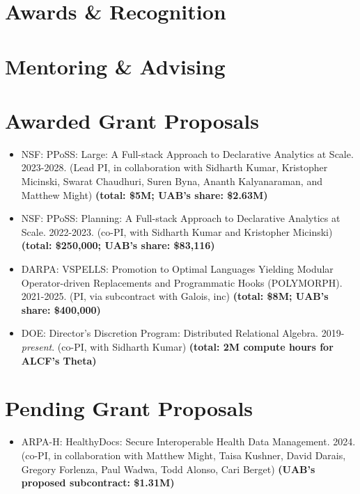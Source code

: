 \documentclass[line]{res}
\begin{document}
\begin{resume}
\section{\large Awards \& Recognition} \vspace{0.2in}


\section{\large Mentoring \& Advising}



\section{\large Awarded Grant Proposals} \vspace{0.45cm}

\begin{itemize}
  \item
  NSF: PPoSS: Large: A Full-stack Approach to Declarative Analytics at Scale. 2023-2028. (Lead PI, in collaboration with Sidharth Kumar, Kristopher Micinski, Swarat Chaudhuri, Suren Byna, Ananth Kalyanaraman, and Matthew Might) \textbf{(total: \$5M; UAB's share: \$2.63M)} 
  \item
  NSF: PPoSS: Planning: A Full-stack Approach to Declarative Analytics at Scale. 2022-2023. (co-PI, with Sidharth Kumar and Kristopher Micinski) \textbf{(total: \$250,000; UAB's share: \$83,116)} 
  \item
  DARPA: VSPELLS: Promotion to Optimal Languages Yielding Modular Operator-driven Replacements and Programmatic Hooks (POLYMORPH). 2021-2025. (PI, via subcontract with Galois, inc) \textbf{(total: \$8M; UAB's share: \$400,000)}
  \item
  DOE: Director's Discretion Program: Distributed Relational Algebra. 2019-\textit{present}. (co-PI, with Sidharth Kumar) \textbf{(total: 2M compute hours for ALCF's Theta)}
\end{itemize}

\section{\large Pending Grant Proposals} \vspace{0.45cm}

\begin{itemize}
  \item
  ARPA-H: HealthyDocs: Secure Interoperable Health Data Management. 2024. (co-PI, in collaboration with Matthew Might, Taisa Kushner, David Darais, Gregory Forlenza, Paul Wadwa, Todd Alonso, Cari Berget) \textbf{(UAB's proposed subcontract: \$1.31M)} 
\end{itemize}


\end{resume}
\end{document}
